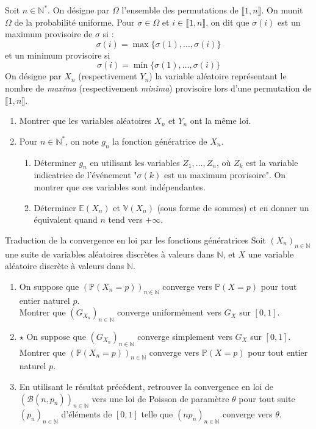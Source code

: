 \documentclass[french,a4paper]{article}
\renewcommand{\P}{\mathbb{P}}
\newcommand{\N}{\mathbb{N}}
\newcommand{\st}{^*}
\newcommand{\E}{\mathbb{E}}
\newcommand{\V}{\mathbb{V}}
\theoremstyle{plain}
\theoremstyle{definition}
\theoremstyle{remark}
\begin{document}
\begin{ex}{}
	Soit $n\in\N\st$. On désigne par $\Omega$ l'ensemble des permutations de $\llbracket1,n\rrbracket$. On munit $\Omega$ de la probabilité uniforme. Pour $\sigma\in\Omega$ et $i\in\llbracket1,n\rrbracket$, on dit que $\sigma(i)$ est un maximum provisoire de $\sigma$ si : $$\sigma(i)=\max\{\sigma(1),\ldots,\sigma(i)\}$$ et un minimum provisoire si $$\sigma(i)=\min\{\sigma(1),\ldots,\sigma(i)\}$$ On désigne par $X_n$ (respectivement $Y_n$) la variable aléatoire représentant le nombre de \textit{maxima} (respectivement \textit{minima}) provisoire lors d'une permutation de $\llbracket1,n\rrbracket$.
	\begin{enumerate}
		\item Montrer que les variables aléatoires $X_n$ et $Y_n$ ont la même loi.
		\item Pour $n\in\N\st$, on note $g_n$ la fonction génératrice de $X_n$.
		\begin{enumerate}[label=\alph*.]
			\item Déterminer $g_n$ en utilisant les variables $Z_1,\ldots,Z_n$, où $Z_k$ est la variable indicatrice de l'événement "$\sigma(k)$ est un maximum provisoire". On montrer que ces variables sont indépendantes.
			\item Déterminer $\E(X_n)$ et $\V(X_n)$ (sous forme de sommes) et en donner un équivalent quand $n$ tend vers $+\infty$.
		\end{enumerate}
	\end{enumerate}
\end{ex}

\begin{ex}{Traduction de la convergence en loi par les fonctions génératrices}
	Soit $(X_n)_{n\in\N}$ une suite de variables aléatoires discrètes à valeurs dans $\N$, et $X$ une variable aléatoire discrète à valeurs dans $\N$.
	\begin{enumerate}
		\item On suppose que $(\P(X_n=p))_{n\in\N}$ converge vers $\P(X=p)$ pour tout entier naturel $p$.\\
		Montrer que $(G_{X_n})_{n\in\N}$ converge uniformément vers $G_X$ sur $[0,1]$.
		\item $\star$ On suppose que $(G_{X_n})_{n\in\N}$ converge simplement vers $G_X$ sur $[0,1]$. \\ Montrer que $(\P(X_n=p))_{n\in\N}$ converge vers $\P(X=p)$ pour tout entier naturel $p$.
		\item En utilisant le résultat précédent, retrouver la convergence en loi de $(\mathcal{B}(n,p_n))_{n\in\N}$ vers une loi de Poisson de paramètre $\theta$ pour tout suite $(p_n)_{n\in\N}$ d'éléments de $[0,1]$ telle que $(np_n)_{n\in\N}$ converge vers $\theta$.
	\end{enumerate}
\end{ex}
\end{document}
